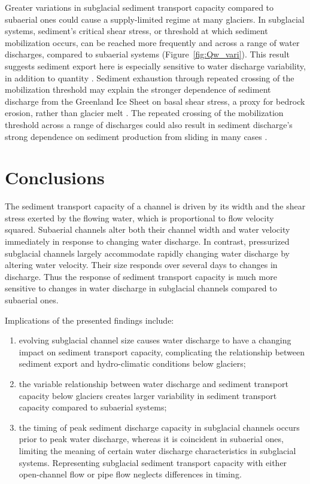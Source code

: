 \documentclass[draft]{agujournal2019}
\begin{document}
Greater variations in subglacial sediment transport capacity compared to subaerial ones could cause a supply-limited regime at many glaciers.
In subglacial systems, sediment's critical shear stress, or threshold at which sediment mobilization occurs, can be reached more frequently and across a range of water discharges, compared to subaerial systems (Figure~\ref{fig:Qw_vari}).
This result suggests sediment export here is especially sensitive to water discharge variability, in addition to quantity \cite{lane2019b}.
Sediment exhaustion through repeated crossing of the mobilization threshold may explain the stronger dependence of sediment discharge from the Greenland Ice Sheet on basal shear stress, a proxy for bedrock erosion, rather than glacier melt \cite{overeem2017}.
The repeated crossing of the mobilization threshold across a range of discharges could also result in sediment discharge's strong dependence on sediment production from sliding in many cases \cite{herman2015,koppes2015}.

\section{Conclusions}

The sediment transport capacity of a channel is driven by its width and the shear stress exerted by the flowing water, which is proportional to  flow velocity squared.
Subaerial channels alter both their channel width and water velocity immediately in response to changing water discharge.
In contrast, pressurized subglacial channels largely accommodate rapidly changing water discharge by altering water velocity.
Their size responds over several days to changes in discharge.
Thus the response of sediment transport capacity is much more sensitive to changes in water discharge in subglacial channels compared to subaerial ones.

Implications of the presented findings include:
\begin{enumerate}
\item  evolving subglacial channel size causes  water discharge to have a changing impact on sediment transport capacity, complicating the relationship between sediment export and hydro-climatic conditions below glaciers;
  \vspace{.1cm}
  
\item the  variable relationship between water discharge and sediment transport capacity below glaciers creates larger variability in sediment transport capacity compared to subaerial systems;
  \vspace{.1cm}

  
\item the timing of peak sediment discharge capacity in subglacial channels occurs prior to peak  water discharge, whereas it is coincident in subaerial ones, limiting the meaning of certain water discharge characteristics in subglacial systems.
  Representing subglacial sediment transport capacity with either open-channel flow or pipe flow neglects differences in timing.
\end{enumerate}
\end{document}
